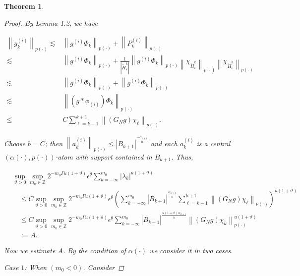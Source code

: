 \documentclass[oneside,reqno]{amsart}
\newtheorem{theorem}{Theorem}[section]
\numberwithin{equation}{section}
\theoremstyle{definition}
\begin{document}
\begin{theorem}
\begin{proof}
By Lemma 1.2, we have


\begin{align*}
\left\|g_{k}^{(i)}\right\|_{{p(\cdot)}} \lesssim & \left\|g^{(i)} \Phi_{k}\right\|_{{p(\cdot)}}+\left\|P^{(i)}_{k}\right\|_{{p(\cdot)}} \\
\lesssim & \left\|g^{(i)} \Phi_{k}\right\|_{{p(\cdot)}}+\frac{1}{\left|\widetilde{H}^k_{ \varepsilon}\right|}\left\|g^{(i)} \Phi_{k}\right\|_{{p(\cdot)}} \left\|\chi_{\widetilde{H}^k_{ \varepsilon}}\right\|_{{\left.p^{(} \cdot\right)}}\left\|\chi_{\widetilde{H}^k_{ \varepsilon}}\right\|_{{p(\cdot)}} \\
\lesssim & \left\|g^{(i)} \Phi_{k}\right\|_{{p(\cdot)}}+\left\|g^{(i)} \Phi_{k}\right\|_{{p(\cdot)}} \\
 \lesssim & \left\|\left(g * \phi_{(i)}\right) \Phi_{k}\right\|_{{p(\cdot)}} \\
\leq  & C \sum_{\ell=k-1}^{k+1}\left\|\left(G_{N} g\right) \chi_\ell \right\|_{{p(\cdot)}} .
\end{align*}


Choose $b=C$; then $\left\|a_{k}^{(i)}\right\|_{{p(\cdot)}} \leq \left|B_{k+1}\right|^{\frac{-\alpha_{k+1}}{n}}$ and each $a_{k}^{(i)}$ is a central $(\alpha(\cdot), p(\cdot))$-atom with support contained in $B_{k+1}$.  Thus,


\begin{align*}
& \sup_{\vartheta>0 } \sup _{m_0\in  \mathbb{Z}} 2^{-m_0\Gamma u(1+\vartheta)}\epsilon  ^\theta \sum_{k=-\infty}^{m_0}\left|\lambda_{k}\right|^{u(1+\vartheta)} \\
& \quad \leq  C \sup_{\vartheta>0 } \sup _{m_0\in  \mathbb{Z}} 2^{-m_0\Gamma u(1+\vartheta)}\epsilon  ^\theta \left( \sum_{k=-\infty}^{m_0}\left|B_{k+1}\right|^{ \frac{\alpha_{k+1}} {n}}\sum_{\ell=k-1}^{k+1}\left\|\left(G_{N}g \right) \chi_\ell \right\|_{{p(\cdot)}}\right)^{u(1+\vartheta)} \\
& \quad \leq  C \sup_{\vartheta>0 } \sup _{m_0\in  \mathbb{Z}} 2^{-m_0\Gamma u(1+\vartheta)}\epsilon  ^\theta \sum_{k=-\infty}^{m_0}\left|B_{k+1}\right|^{\frac{u(1+\vartheta) \alpha_{k+1}} { n}}\left\|\left(G_{N}g \right) \chi_{k}\right\|_{{p(\cdot)}}^{u(1+\vartheta)} \\
& \quad:=A . 
\end{align*}


Now we estimate $A$. By the condition of $\alpha(\cdot)$ we consider it in two cases.

Case $1$: When $(m_0<0)$. Consider



\end{proof}
\end{theorem}
\end{document}
